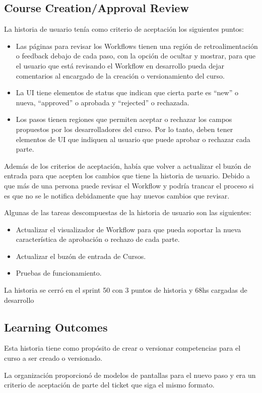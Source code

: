 \subsection{Course Creation/Approval Review}
La historia de usuario tenía como criterio de aceptación los siguientes puntos:
\begin{itemize}
	\item Las páginas para revisar los Workflows tienen una región de retroalimentación o feedback debajo de cada paso, con la opción de ocultar y mostrar, para que el usuario que está revisando el Workflow en desarrollo pueda dejar comentarios al encargado de la creación o versionamiento del curso.
	\item La UI tiene elementos de status que indican que cierta parte es “new” o nueva, “approved” o aprobada y “rejected” o rechazada.
	\item Los pasos tienen regiones que permiten aceptar o rechazar los campos propuestos por los desarrolladores del curso. Por lo tanto, deben tener elementos de UI que indiquen al usuario que puede aprobar o rechazar cada parte.
\end{itemize}
Además de los criterios de aceptación, había que volver a actualizar el buzón de entrada para que acepten los cambios que tiene la historia de usuario. Debido a que más de una persona puede revisar el Workflow y podría trancar el proceso si es que no se le notifica debidamente que hay nuevos cambios que revisar.

Algunas de las tareas descompuestas de la historia de usuario son las siguientes:
\begin{itemize}
	\item Actualizar el visualizador de Workflow para que pueda soportar la nueva característica de aprobación o rechazo de cada parte.
	\item Actualizar el buzón de entrada de Cursos.
	\item Pruebas de funcionamiento.
\end{itemize}

La historia se cerró en el sprint 50 con 3 puntos de historia y 68hs cargadas de desarrollo

\subsection{Learning Outcomes}
Esta historia tiene como propósito de crear o versionar competencias para el curso a ser creado o versionado. 

La organización proporcionó de modelos de pantallas para el nuevo paso y era un criterio de aceptación de parte del ticket que siga el mismo formato.


